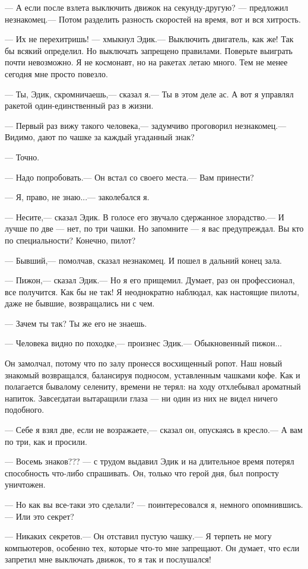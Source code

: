 \documentclass[11pt,a4paper,oneside]{article}
\begin{document}
— А если после взлета выключить движок на секунду-другую? — предложил незнакомец.— Потом разделить разность скоростей на время, вот и вся хитрость.

— Их не перехитришь! — хмыкнул Эдик.— Выключить двигатель, как же! Так бы всякий определил. Но выключать запрещено правилами. Поверьте выиграть почти невозможно. Я не космонавт, но на ракетах летаю много. Тем не менее сегодня мне просто повезло.

— Ты, Эдик, скромничаешь,— сказал я.— Ты в этом деле ас. А вот я управлял ракетой один-единственный раз в жизни.

— Первый раз вижу такого человека,— задумчиво проговорил незнакомец.— Видимо, дают по чашке за каждый угаданный знак?

— Точно.

— Надо попробовать.— Он встал со своего места.— Вам принести?

— Я, право, не знаю...— заколебался я.

— Несите,— сказал Эдик. В голосе его звучало сдержанное злорадство.— И лучше по две — нет, по три чашки. Но запомните — я вас предупреждал. Вы кто по специальности? Конечно, пилот?

— Бывший,— помолчав, сказал незнакомец. И пошел в дальний конец зала.

— Пижон,— сказал Эдик.— Но я его прищемил. Думает, раз он профессионал, все получится. Как бы не так! Я неоднократно наблюдал, как настоящие пилоты, даже не бывшие, возвращались ни с чем.

— Зачем ты так? Ты же его не знаешь.

— Человека видно по походке,— произнес Эдик.— Обыкновенный пижон...

Он замолчал, потому что по залу пронесся восхищенный ропот. Наш новый знакомый возвращался, балансируя подносом, уставленным чашками кофе. Как и полагается бывалому селениту, времени не терял: на ходу отхлебывал ароматный напиток. Завсегдатаи вытаращили глаза — ни один из них не видел ничего подобного.

— Себе я взял две, если не возражаете,— сказал он, опускаясь в кресло.— А вам по три, как и просили.

— Восемь знаков??? — с трудом выдавил Эдик и на длительное время потерял способность что-либо спрашивать. Он, только что герой дня, был попросту уничтожен.

— Но как вы все-таки это сделали? — поинтересовался я, немного опомнившись.— Или это секрет?

— Никаких секретов.— Он отставил пустую чашку.— Я терпеть не могу компьютеров, особенно тех, которые что-то мне запрещают. Он думает, что если запретил мне выключать движок, то я так и послушался!
\end{document}
